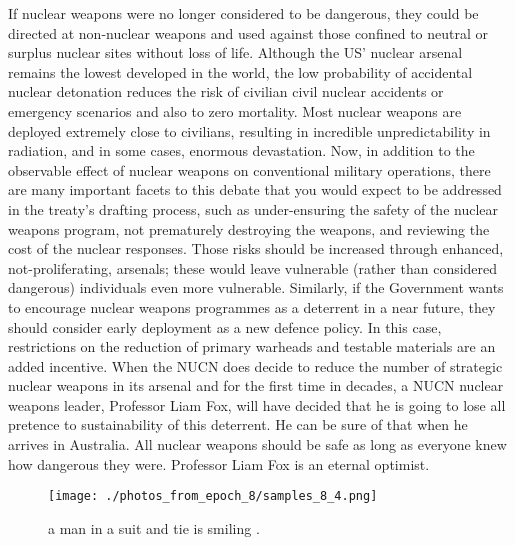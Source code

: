 \documentclass{article}%
\begin{document}
If nuclear weapons were no longer considered to be dangerous, they could be directed at non{-}nuclear weapons and used against those confined to neutral or surplus nuclear sites without loss of life. Although the US’ nuclear arsenal remains the lowest developed in the world, the low probability of accidental nuclear detonation reduces the risk of civilian civil nuclear accidents or emergency scenarios and also to zero mortality. Most nuclear weapons are deployed extremely close to civilians, resulting in incredible unpredictability in radiation, and in some cases, enormous devastation.\newline%
Now, in addition to the observable effect of nuclear weapons on conventional military operations, there are many important facets to this debate that you would expect to be addressed in the treaty’s drafting process, such as under{-}ensuring the safety of the nuclear weapons program, not prematurely destroying the weapons, and reviewing the cost of the nuclear responses. Those risks should be increased through enhanced, not{-}proliferating, arsenals; these would leave vulnerable (rather than considered dangerous) individuals even more vulnerable. Similarly, if the Government wants to encourage nuclear weapons programmes as a deterrent in a near future, they should consider early deployment as a new defence policy. In this case, restrictions on the reduction of primary warheads and testable materials are an added incentive.\newline%
When the NUCN does decide to reduce the number of strategic nuclear weapons in its arsenal and for the first time in decades, a NUCN nuclear weapons leader, Professor Liam Fox, will have decided that he is going to lose all pretence to sustainability of this deterrent. He can be sure of that when he arrives in Australia. All nuclear weapons should be safe as long as everyone knew how dangerous they were. Professor Liam Fox is an eternal optimist.\newline%

%


\begin{figure}[h!]%
\centering%
\texttt{[image: ./photos\_from\_epoch\_8/samples\_8\_4.png]}%
\caption{a man in a suit and tie is smiling .}%
\end{figure}

%
\end{document}
